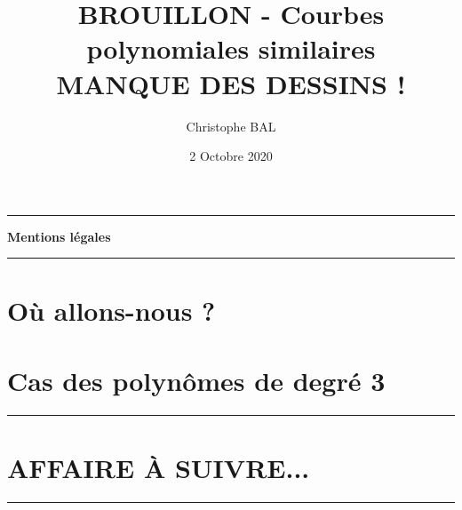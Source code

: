 \documentclass[12pt]{amsart}
\begin{document}
\title{BROUILLON - Courbes polynomiales similaires \\ MANQUE DES DESSINS !}
\author{Christophe BAL}
\date{2 Octobre 2020}
\maketitle


\begin{center}
	\hrule\vspace{.3em}
	{
		\fontsize{1.35em}{1em}\selectfont
		\textbf{Mentions \og légales \fg}
	}
			
	\vspace{0.45em}
	\doclicenseThis
	\hrule
\end{center}



\setcounter{tocdepth}{2}
\tableofcontents




\newpage
\section{Où allons-nous ?}






\section{Cas des polynômes de degré 3} 







%

\newpage

\hrule

\section{AFFAIRE À SUIVRE...}

\bigskip

\hrule
\end{document}
